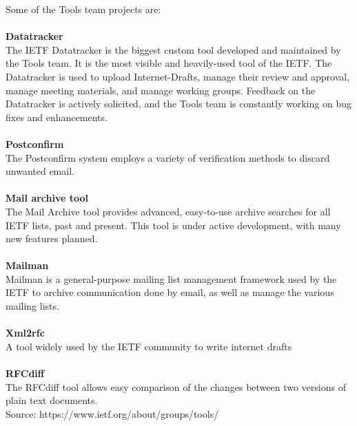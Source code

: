 \documentclass[a4paper,english]{report}
\begin{document}
Some of the Tools team projects are: \\\\
\textbf{Datatracker}\\
The IETF Datatracker is the biggest custom tool developed and maintained by the Tools team. It is the most visible and heavily-used tool of the IETF. The Datatracker is used to upload Internet-Drafts, manage their review and approval, manage meeting materials, and manage working groups. Feedback on the Datatracker is actively solicited, and the Tools team is constantly working on bug fixes and enhancements.\\
\\\textbf{Postconfirm}\\
The Postconfirm system employs a variety of verification methods to discard unwanted email.\\
\\\textbf{Mail archive tool}\\
The Mail Archive tool provides advanced, easy-to-use archive searches for all IETF lists, past and present. This tool is under active development, with many new features planned.\\
\\\textbf{Mailman}\\
Mailman is a general-purpose mailing list management framework used by the IETF to archive communication done by email, as well as manage the various mailing lists.\\
\\\textbf{Xml2rfc}\\
A tool widely used by the IETF community to write internet drafts \\
\\\textbf{RFCdiff}\\
The RFCdiff tool allows easy comparison of the changes between two versions of plain text documents.\\

Source: https://www.ietf.org/about/groups/tools/
\end{document}

